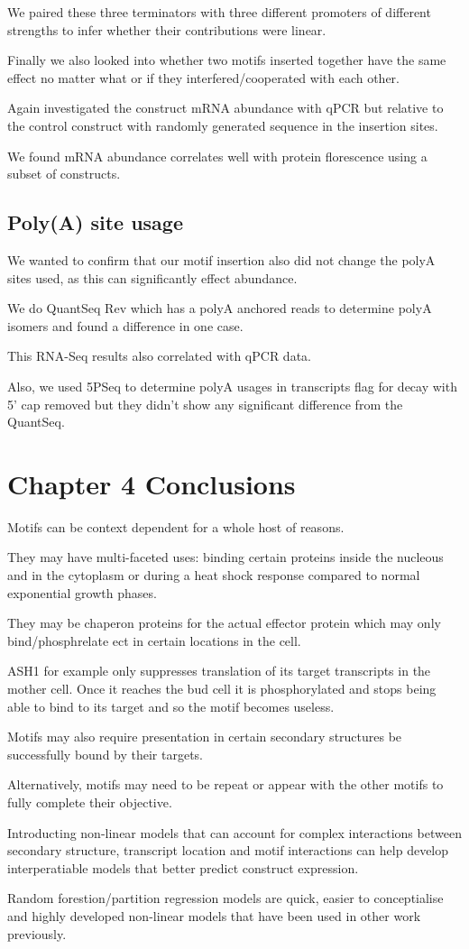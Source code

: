 \documentclass{SBCbookchapter}
\begin{document}
We paired these three terminators with three different promoters of different strengths to infer whether their contributions were linear. 

Finally we also looked into whether two motifs inserted together have the same effect no matter what or if they interfered/cooperated with each other.

Again investigated the construct mRNA abundance with qPCR but relative to the control construct with randomly generated sequence in the insertion sites.

We found mRNA abundance correlates well with protein florescence using a subset of constructs.

\subsection{Poly(A) site usage}

We wanted to confirm that our motif insertion also did not change the polyA sites used, as this can significantly effect abundance.

We do QuantSeq Rev which has a polyA anchored reads to determine polyA isomers and found a difference in one case.

This RNA-Seq results also correlated with qPCR data.

Also, we used 5PSeq to determine polyA usages in transcripts flag for decay with 5' cap removed but they didn't show any significant difference from the QuantSeq.

\section{Chapter 4 Conclusions}

Motifs can be context dependent for a whole host of reasons.

They may have multi-faceted uses: binding certain proteins inside the nucleous and in the cytoplasm or during a heat shock response compared to normal exponential growth phases.

They may be chaperon proteins for the actual effector protein which may only bind/phosphrelate ect in certain locations in the cell.

ASH1 for example only suppresses translation of its target transcripts in the mother cell. Once it reaches the bud cell it is phosphorylated and stops being able to bind to its target and so the motif becomes useless.

Motifs may also require presentation in certain secondary structures be successfully bound by their targets.

Alternatively, motifs may need to be repeat or appear with the other motifs to fully complete their objective.

Introducting non-linear models that can account for complex interactions between secondary structure, transcript location and motif interactions can help develop interperatiable models that better predict construct expression.

Random forestion/partition regression models are quick, easier to conceptialise and highly developed non-linear models that have been used in other work previously.



\end{document}
